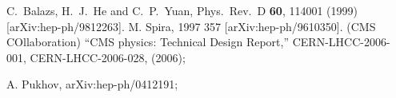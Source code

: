 \documentclass[aps,prl,twocolumn,nofootinbib,superscriptaddress]{revtex4}
\begin{document}
\begin{thebibliography}{99}
  C.~Balazs, H.~J.~He and C.~P.~Yuan,
  Phys.\ Rev.\  D {\bf 60}, 114001 (1999)
  [arXiv:hep-ph/9812263].
 M. Spira,  {1997} {357} [arXiv:hep-ph/9610350].
  (CMS COllaboration) ``CMS physics: Technical Design Report,''  CERN-LHCC-2006-001, 
CERN-LHCC-2006-028, (2006);

 A. Pukhov, arXiv:hep-ph/0412191;

\end{thebibliography}
\end{document}

